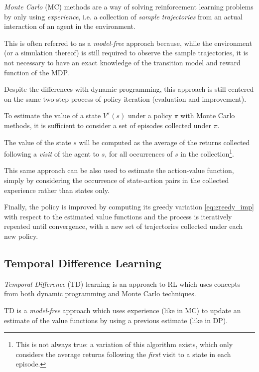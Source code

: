 \textit{Monte Carlo} (MC) methods are a way of solving reinforcement learning 
problems by only using \textit{experience}, i.e. a collection of \textit{sample 
trajectories} from an actual interaction of an agent in the environment.

This is often referred to as a \textit{model-free} approach because, while the
environment (or a simulation thereof) is still required to observe the sample
trajectories, it is not necessary to have an exact knowledge of the transition 
model and reward function of the MDP. 

Despite the differences with dynamic programming, this approach is still 
centered on the same two-step process of policy iteration (evaluation and 
improvement).

To estimate the value of a state $V^\pi(s)$ under a policy $\pi$ with Monte 
Carlo methods, it is sufficient to consider a set of episodes collected under 
$\pi$.

The value of the state $s$ will be computed as the average of the returns 
collected following a \textit{visit} of the agent to $s$, for all occurrences of
$s$ in the collection\footnote{This is not always true: a variation of this 
algorithm exists, which only considers the average returns following the 
\textit{first} visit to a state in each episode.}.

This same approach can be also used to estimate the action-value function, 
simply by considering the occurrence of state-action pairs in the collected 
experience rather than states only. 

Finally, the policy is improved by computing its greedy variation \eqref{eq:greedy_imp}
with respect to the estimated value functions and the process is iteratively
repeated until convergence, with a new set of trajectories collected under each 
new policy.

\subsection{Temporal Difference Learning}
\textit{Temporal Difference} (TD) learning is an approach to RL which uses 
concepts from both dynamic programming and Monte Carlo techniques. 

TD is a \textit{model-free } approach which uses experience (like in MC)
to update an estimate of the value functions by using a previous estimate 
(like in DP).

